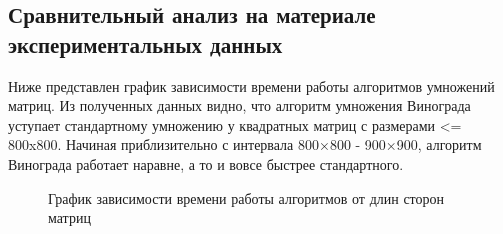 \documentclass[a4paper,12pt]{article}
\begin{document}
\newpage
\subsection{Сравнительный анализ на материале экспериментальных данных}
Ниже представлен график зависимости времени работы алгоритмов умножений матриц. Из полученных данных видно, что алгоритм умножения Винограда уступает стандартному умножению у квадратных матриц с размерами <= 800x800. Начиная приблизительно с интервала 800×800 - 900×900, алгоритм Винограда работает наравне, а то и вовсе быстрее стандартного.
\begin{figure}[h!]
\caption{График зависимости времени работы алгоритмов от длин сторон матриц}
\label{images:graphics}
\end{figure}

\newpage
\end{document}
